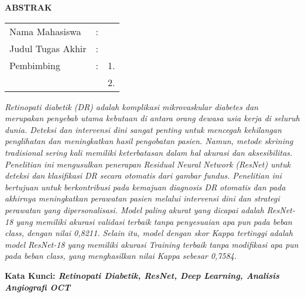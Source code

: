 \begin{center}
  \large\textbf{ABSTRAK}
\end{center}


\vspace{2ex}

\begingroup
\setlength{\tabcolsep}{0pt}

\noindent
\begin{tabularx}{\textwidth}{l >{\centering}m{2em} X}
  Nama Mahasiswa    & : & \name{}         \\

  Judul Tugas Akhir & : & \tatitle{}      \\

  Pembimbing        & : & 1. \advisor{}   \\
                    &   & 2. \coadvisor{} \\
\end{tabularx}
\endgroup

\emph{Retinopati diabetik (DR) adalah komplikasi mikrovaskular diabetes dan merupakan penyebab utama kebutaan di antara orang dewasa usia kerja di seluruh dunia. Deteksi dan intervensi dini sangat penting untuk mencegah kehilangan penglihatan dan meningkatkan hasil pengobatan pasien. Namun, metode skrining tradisional sering kali memiliki keterbatasan dalam hal akurasi dan aksesibilitas. Penelitian ini mengusulkan penerapan Residual Neural Network (ResNet) untuk deteksi dan klasifikasi DR secara otomatis dari gambar fundus. Penelitian ini bertujuan untuk berkontribusi pada kemajuan diagnosis DR otomatis dan pada akhirnya meningkatkan perawatan pasien melalui intervensi dini dan strategi perawatan yang dipersonalisasi. Model paling akurat yang dicapai adalah ResNet-18 yang memiliki akurasi validasi terbaik tanpa penyesuaian apa pun pada beban class, dengan nilai 0,8211. Selain itu, model dengan skor Kappa tertinggi adalah model ResNet-18 yang memiliki akurasi Training terbaik tanpa modifikasi apa pun pada beban class, yang menghasilkan nilai Kappa sebesar 0,7584.}

\textbf{Kata Kunci: \emph{Retinopati Diabetik, ResNet, Deep Learning, Analisis Angiografi OCT}}
